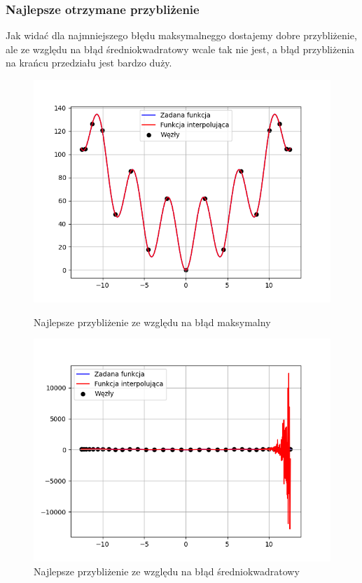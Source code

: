 \documentclass{article}
\begin{document}
\subsubsection{Najlepsze otrzymane przybliżenie}

Jak widać dla najmniejszego błędu maksymalneggo dostajemy dobre przybliżenie, ale ze względu na błąd średniokwadratowy wcale tak nie jest, a błąd przybliżenia na krańcu przedziału jest bardzo duży.

\begin{figure}[H]
  \begin{minipage}[b]{0.49\textwidth}
    \includegraphics[width=\textwidth]{img16.png}
    \caption{Najlepsze przybliżenie ze względu na błąd maksymalny}
  \end{minipage}
  \hfill
  \begin{minipage}[b]{0.49\textwidth}
    \includegraphics[width=\textwidth]{img17.png}
    \caption{Najlepsze przybliżenie ze względu na błąd średniokwadratowy}
  \end{minipage}
\end{figure}
\end{document}
